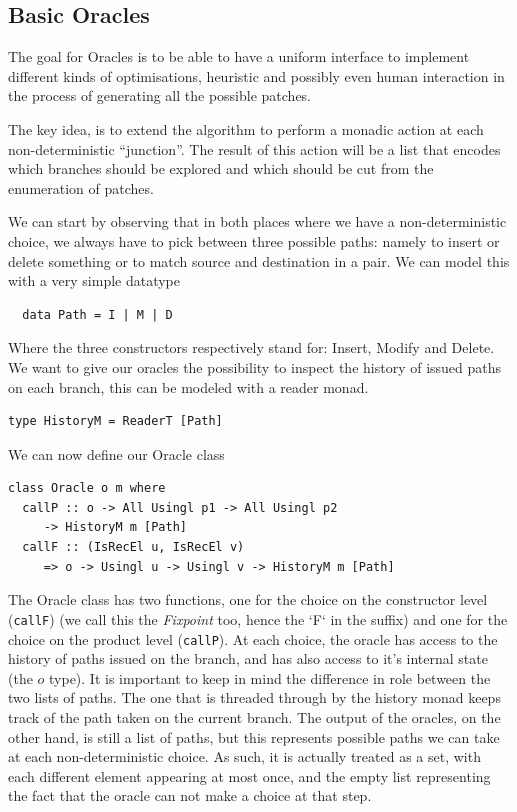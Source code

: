 \documentclass[11pt, titlepage]{article}
\newcommand{\toHaskell}[1]{\texttt{#1}\xspace}
\begin{document}
\subsection{Basic Oracles}\label{oracles}
The goal for Oracles is to be able to have a uniform interface to implement different kinds of optimisations, heuristic and possibly even human interaction in the process of generating all the possible patches.
 
The key idea, is to extend the algorithm to perform a monadic action at each non-deterministic ``junction''. The result of this action will be a list that encodes which branches should be explored and which should be cut from the enumeration of patches.

We can start by observing that in both places where we have a non-deterministic choice, we always have to pick between three possible paths: namely to insert or delete something or to match source and destination in a pair. We can model this with a very simple datatype

\begin{verbatim}
  data Path = I | M | D 
\end{verbatim}

Where the three constructors respectively stand for: Insert, Modify and Delete.
We want to give our oracles the possibility to inspect the history of issued paths on each branch, this can be modeled with a reader monad.

\begin{verbatim}
type HistoryM = ReaderT [Path]
\end{verbatim}

We can now define our Oracle class

\begin{verbatim}
class Oracle o m where
  callP :: o -> All Usingl p1 -> All Usingl p2 
  	 -> HistoryM m [Path]
  callF :: (IsRecEl u, IsRecEl v) 
	 => o -> Usingl u -> Usingl v -> HistoryM m [Path]
\end{verbatim}


The Oracle class has two functions, one for the choice on the constructor level (\toHaskell{callF}) (we call this the \textit{Fixpoint} too, hence the `F` in the suffix) and one for the choice on the product level (\toHaskell{callP}). At each choice, the oracle has access to the history of paths issued on the branch, and has also access to it's internal state (the $o$ type).
It is important to keep in mind the difference in role between the two lists of paths. The one that is threaded through by the history monad keeps track of the path taken on the current branch. The output of the oracles, on the other hand, is still a list of paths, but this represents possible paths we can take at each non-deterministic choice. As such, it is actually treated as a set, with each different element appearing at most once, and the empty list representing the fact that the oracle can not make a choice at that step.
\end{document}

